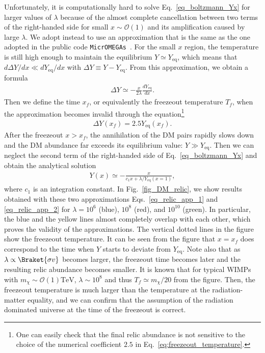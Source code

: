 \documentclass[12pt,twoside,book]{article}
\begin{document}
Unfortunately, it is computationally hard to solve Eq.~\eqref{eq_boltzmann_Yx} for larger values of $\lambda$ because of the almost complete cancellation between two terms of the right-handed side for small $x\sim \mathcal{O}(1)$ and its amplification caused by large $\lambda$.
We adopt instead to use an approximation that is the same as the one adopted in the public code \texttt{MicrOMEGAs}~\cite{Belanger:2001fz, Belanger:2018mqt}.
For the small $x$ region, the temperature is still high enough to maintain the equilibrium $Y \simeq Y_{\mathrm{eq}}$, which means that $d \Delta Y / d x \ll d Y_{\mathrm{eq}} / d x$ with $\Delta Y \equiv Y - Y_{\mathrm{eq}}$.
From this approximation, we obtain a formula
\begin{align}
  \Delta Y \simeq -\frac{x}{2 \lambda} \frac{d Y_{\mathrm{eq}}}{d x}.\label{eq_relic_app_1}
\end{align}
Then we define the time $x_f$, or equivalently the freezeout temperature $T_f$, when the approximation becomes invalid through the equation\footnote{
  One can easily check that the final relic abundance is not sensitive to the choice of the numerical coefficient $2.5$ in Eq.~\eqref{eq:freezeout_temperature}.
}
\begin{align}
  \Delta Y (x_f) = 2.5 Y_{\mathrm{eq}} (x_f).
  \label{eq:freezeout_temperature}
\end{align}
After the freezeout $x > x_f$, the annihilation of the DM pairs rapidly slows down and the DM abundance far exceeds its equilibrium value: $Y \gg Y_{\mathrm{eq}}$.
Then we can neglect the second term of the right-handed side of Eq.~\eqref{eq_boltzmann_Yx} and obtain the analytical solution
\begin{align}
  Y(x) \simeq - \frac{x}{c_1 x + \lambda / Y_{\mathrm{eq}} (x=1)},\label{eq_relic_app_2}
\end{align}
where $c_1$ is an integration constant.
In Fig.~\ref{fig_DM_relic}, we show results obtained with these two approximations Eqs.~\eqref{eq_relic_app_1} and \eqref{eq_relic_app_2} for $\lambda = 10^6$ (blue), $10^8$ (red), and $10^{10}$ (green).
In particular, the blue and the yellow lines almost completely overlap with each other, which proves the validity of the approximations.
The vertical dotted lines in the figure show the freezeout temperature.
It can be seen from the figure that $x = x_f$ does correspond to the time when $Y$ starts to deviate from $Y_{\mathrm{eq}}$.
Note also that as $\lambda \propto \Braket{\sigma v}$ becomes larger, the freezeout time becomes later and the resulting relic abundance becomes smaller.
It is known that for typical WIMPs with $m_\chi \sim \mathcal{O}(1)\mathrm{TeV}$, $\lambda \sim 10^8$ and thus $T_f \simeq m_\chi / 20$ from the figure.
Then, the freezeout temperature is much larger than the temperature at the radiation-matter equality, and we can confirm that the assumption of the radiation dominated universe at the time of the freezeout is correct.
\end{document}
